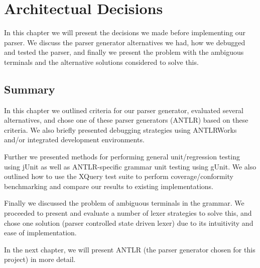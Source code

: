 \chapter{Architectual Decisions}
\label{chapter:method}

In this chapter we will present the decisions we made before implementing our
parser. We discuss the parser generator alternatives we had, how we debugged and
tested the parser, and finally we present the problem with the ambiguous
terminals and the alternative solutions considered to solve this.





\section{Summary}
In this chapter we outlined criteria for our parser generator, evaluated
several alternatives, and chose one of these parser generators (ANTLR) based on
these criteria. We also briefly presented debugging strategies using
ANTLRWorks and/or integrated development environments.

Further we presented methods for performing general unit/regression testing
using jUnit as well as ANTLR-specific grammar unit testing using gUnit. We also
outlined how to use the XQuery test suite to perform coverage/conformity
benchmarking and compare our results to existing implementations.

Finally we discussed the problem of ambiguous terminals in the grammar. We
proceeded to present and evaluate a number of lexer strategies to solve this,
and chose one solution (parser controlled state driven lexer) due to its
intuitivity and ease of implementation.

In the next chapter, we will present ANTLR (the parser generator chosen for this
project) in more detail.